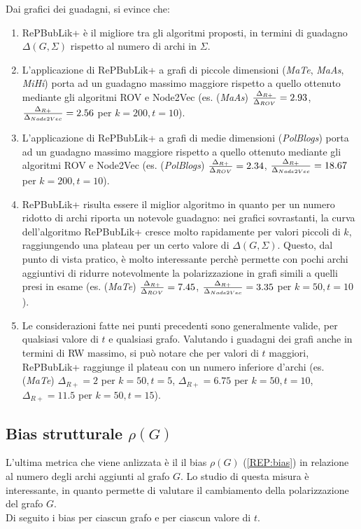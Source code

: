 Dai grafici dei guadagni, si evince che:
\begin{enumerate}
    \item RePBubLik+ è il migliore tra gli algoritmi proposti, in termini di guadagno $\Delta(G,\Sigma)$ rispetto al numero di archi in $\Sigma$.
    \item L'applicazione di RePBubLik+ a grafi di piccole dimensioni (\emph{MaTe}, \emph{MaAs}, \emph{MiHi}) porta ad un guadagno massimo maggiore rispetto a quello ottenuto mediante gli algoritmi ROV e Node2Vec (es. (\emph{MaAs}) ${\Delta_{R+}\over{\Delta_{ROV}}}=2.93$, ${\Delta_{R+}\over{\Delta_{Node2Vec}}}=2.56$ per $k=200,t=10$).
    \item L'applicazione di RePBubLik+ a grafi di medie dimensioni (\emph{PolBlogs}) porta ad un guadagno massimo maggiore rispetto a quello ottenuto mediante gli algoritmi ROV e Node2Vec (es. (\emph{PolBlogs}) ${\Delta_{R+}\over{\Delta_{ROV}}}=2.34$, ${\Delta_{R+}\over{\Delta_{Node2Vec}}}=18.67$ per  $k=200,t=10$).
    \item RePBubLik+ risulta essere il miglior algoritmo in quanto per un numero ridotto di archi riporta un notevole guadagno: nei grafici sovrastanti, la curva dell'algoritmo RePBubLik+ cresce molto rapidamente per valori piccoli di $k$, raggiungendo una plateau per un certo valore di $\Delta(G,\Sigma)$.
            Questo, dal punto di vista pratico, è molto interessante perchè permette con pochi archi aggiuntivi di ridurre notevolmente la polarizzazione in grafi simili a quelli presi in esame (es. (\emph{MaTe}) ${\Delta_{R+}\over{\Delta_{ROV}}}=7.45$, ${\Delta_{R+}\over{\Delta_{Node2Vec}}}=3.35$ per $k=50,t=10$).
    \item Le considerazioni fatte nei punti precedenti sono generalmente valide, per qualsiasi valore di $t$ e qualsiasi grafo. Valutando i guadagni dei grafi anche in termini di RW massimo, si può notare che per valori di $t$ maggiori, RePBubLik+ raggiunge il plateau con un numero inferiore d'archi (es. (\emph{MaTe}) $\Delta_{R+}=2$ per $k=50, t=5$,  $\Delta_{R+}=6.75$ per $k=50,t=10$, $\Delta_{R+}=11.5$ per $k=50,t=15$).
\end{enumerate}
\subsection{Bias strutturale $\rho(G)$}
L'ultima metrica che viene anlizzata è il il bias $\rho(G)$ (\ref{REP:bias}) in relazione al numero 
degli archi aggiunti al grafo $G$. Lo studio di questa misura è interessante, in quanto permette di valutare il cambiamento della polarizzazione del grafo $G$.
\\
Di seguito i bias per ciascun grafo e per ciascun valore di $t$.

